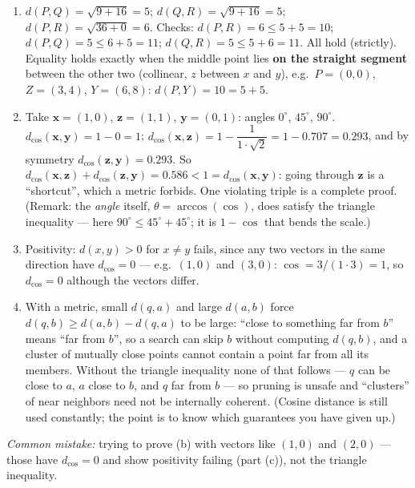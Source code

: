 \documentclass[
  11pt,
]{article}
\newcounter{none} %
\begin{document}
\begin{solutionbox}

\begin{enumerate}
\def\labelenumi{(\alph{enumi})}
\item
  \(d(P,Q) = \sqrt{9+16} = 5\); \(d(Q,R) = \sqrt{9+16} = 5\);
  \(d(P,R) = \sqrt{36+0} = 6\). Checks: \(d(P,R) = 6 \le 5+5 = 10\);
  \(d(P,Q) = 5 \le 6+5 = 11\); \(d(Q,R) = 5 \le 5+6 = 11\). All hold
  (strictly). Equality holds exactly when the middle point lies
  \textbf{on the straight segment} between the other two (collinear,
  \(z\) between \(x\) and \(y\)), e.g.~\(P=(0,0)\), \(Z=(3,4)\),
  \(Y=(6,8)\): \(d(P,Y) = 10 = 5 + 5\).
\item
  Take \(\mathbf{x} = (1,0)\), \(\mathbf{z} = (1,1)\),
  \(\mathbf{y} = (0,1)\): angles \(0^\circ\), \(45^\circ\),
  \(90^\circ\). \(d_{\cos}(\mathbf{x},\mathbf{y}) = 1 - 0 = 1\);
  \(d_{\cos}(\mathbf{x},\mathbf{z}) = 1 - \dfrac{1}{1\cdot\sqrt2} = 1 - 0.707 = 0.293\),
  and by symmetry \(d_{\cos}(\mathbf{z},\mathbf{y}) = 0.293\). So
  \(d_{\cos}(\mathbf{x},\mathbf{z}) + d_{\cos}(\mathbf{z},\mathbf{y}) = 0.586 < 1 = d_{\cos}(\mathbf{x},\mathbf{y})\):
  going through \(\mathbf{z}\) is a ``shortcut'', which a metric
  forbids. One violating triple is a complete proof. (Remark: the
  \emph{angle} itself, \(\theta = \arccos(\cos)\), does satisfy the
  triangle inequality --- here \(90^\circ \le 45^\circ + 45^\circ\); it
  is \(1-\cos\) that bends the scale.)
\item
  Positivity: \(d(x,y)>0\) for \(x\ne y\) fails, since any two vectors
  in the same direction have \(d_{\cos} = 0\) --- e.g.~\((1,0)\) and
  \((3,0)\): \(\cos = 3/(1\cdot3) = 1\), so \(d_{\cos} = 0\) although
  the vectors differ.
\item
  With a metric, small \(d(q,a)\) and large \(d(a,b)\) force
  \(d(q,b) \ge d(a,b) - d(q,a)\) to be large: ``close to something far
  from \(b\)'' means ``far from \(b\)'', so a search can skip \(b\)
  without computing \(d(q,b)\), and a cluster of mutually close points
  cannot contain a point far from all its members. Without the triangle
  inequality none of that follows --- \(q\) can be close to \(a\), \(a\)
  close to \(b\), and \(q\) far from \(b\) --- so pruning is unsafe and
  ``clusters'' of near neighbors need not be internally coherent.
  (Cosine distance is still used constantly; the point is to know which
  guarantees you have given up.)
\end{enumerate}

\emph{Common mistake:} trying to prove (b) with vectors like \((1,0)\)
and \((2,0)\) --- those have \(d_{\cos}=0\) and show positivity failing
(part (c)), not the triangle inequality.

\end{solutionbox}
\end{document}
